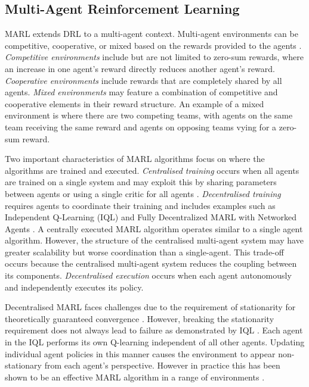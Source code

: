 \documentclass[conference,compsoc]{IEEEtran}
\begin{document}

\subsection{Multi-Agent Reinforcement Learning}
MARL extends DRL to a multi-agent context. Multi-agent environments can be competitive, cooperative, or mixed based on the rewards provided to the agents \cite{busoniu_comprehensive_2008}. \textit{Competitive environments} include but are not limited to zero-sum rewards, where an increase in one agent's reward directly reduces another agent's reward. \textit{Cooperative environments} include rewards that are completely shared by all agents. \textit{Mixed environments} may feature a combination of competitive and cooperative elements in their reward structure. An example of a mixed environment is where there are two competing teams, with agents on the same team receiving the same reward and agents on opposing teams vying for a zero-sum reward.

Two important characteristics of MARL algorithms focus on where the algorithms are trained and executed. \textit{Centralised training} occurs when all agents are trained on a single system and may exploit this by sharing parameters between agents \cite{gupta_cooperative_2017} or using a single critic for all agents \cite{foerster_counterfactual_2018}. \textit{Decentralised training} requires agents to coordinate their training and includes examples such as Independent Q-Learning (IQL) \cite{tan_multi-agent_1993} and Fully Decentralized MARL with Networked Agents \cite{zhang_fully_2018}. A centrally executed MARL algorithm operates similar to a single agent algorithm. However, the structure of the centralised multi-agent system may have greater scalability but worse coordination than a single-agent. This trade-off  occurs because the centralised multi-agent system reduces the coupling between its components. \textit{Decentralised execution} occurs when each agent autonomously and independently executes its policy.

Decentralised MARL \cite{tan_multi-agent_1993, matignon_independent_2012, zhang_fully_2018} faces challenges due to the requirement of stationarity for theoretically guaranteed convergence \cite{matignon_independent_2012}. However, breaking the stationarity requirement does not always lead to failure as demonstrated by IQL \cite{tan_multi-agent_1993}. Each agent in the IQL performs its own Q-learning independent of all other agents. Updating individual agent policies in this manner causes the environment to appear non-stationary from each agent's perspective. However in practice this has been shown to be an effective MARL algorithm in a range of environments \cite{matignon_independent_2012}.
\end{document}

